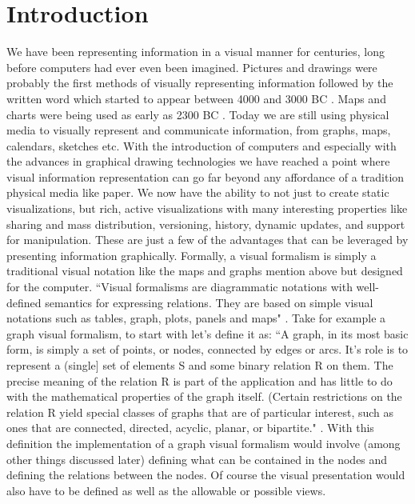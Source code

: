 \documentclass{sig-alternate}
\begin{document}
\section{Introduction}
We have been representing information in a visual manner for centuries, long
before computers had ever even been imagined. Pictures and drawings were
probably the first methods of visually representing information followed by the
written word which started to appear between 4000 and 3000 BC
\cite{HistoryOfWriting}. Maps and charts were
being used as early as 2300 BC
\cite{HistoryMapsCartography}. Today we are
still using physical media to visually represent and communicate information,
from graphs, maps, calendars, sketches etc. With the introduction of computers
and especially with the advances in graphical drawing technologies we have
reached a point where visual information representation can go far beyond any
affordance of a tradition physical media like paper. We now have the ability to
not just to create static visualizations, but rich, active visualizations with
many interesting properties like sharing and mass distribution, versioning,
history, dynamic updates, and support for manipulation. These are just a few of
the advantages that can be leveraged by presenting information graphically.
Formally, a visual formalism is simply a traditional visual notation like the
maps and graphs mention above but designed for the computer. ``Visual formalisms
are diagrammatic notations with well-defined semantics for expressing relations.
They are based on simple visual notations such as tables, graph, plots, panels
and maps" \cite{Nardi}. Take for example a graph visual formalism, to start with
let's define it as: ``A graph, in its most basic form, is simply a set of points,
or nodes, connected by edges or arcs. It's role is to represent a (single] set
of elements S and some binary relation R on them. The precise meaning of the
relation R is part of the application and has little to do with the mathematical
properties of the graph itself. (Certain restrictions on the relation R yield
special classes of graphs that are of particular interest, such as ones that are
connected, directed, acyclic, planar, or bipartite." \cite{Harel}. With this
definition the implementation of a graph visual formalism would involve (among
other things discussed later) defining what can be contained in the nodes and
defining the relations between the nodes. Of course the visual presentation
would also have to be defined as well as the allowable or possible views.
\end{document}
